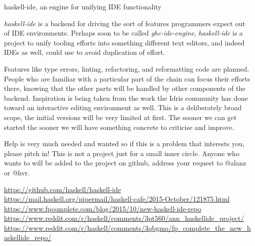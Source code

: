 \documentclass[DIV16,twocolumn,10pt]{scrreprt}
\begin{document}
\begin{hcarentry}{haskell-ide, an engine for unifying IDE functionality}

\makeheader

\textit{haskell-ide} is a backend for driving the sort of features programmers expect out of IDE environments. Perhaps soon to be called \textit{ghc-ide-engine}, \textit{haskell-ide} is a project to unify tooling efforts into something different text editors, and indeed IDEs as well, could use to avoid duplication of effort.

Features like type errors, linting, refactoring, and reformatting code are planned. People who are familiar with a particular part of the chain can focus their efforts there, knowing that the other parts will be handled by other components of the backend. Inspiration is being taken from the work the Idris community has done toward an interactive editing environment as well. This is a deliberately broad scope, the initial versions will be very limited at first. The sooner we can get started the sooner we will have something concrete to criticise and improve.

Help is very much needed and wanted so if this is a problem that interests you, please pitch in! This is not a project just for a small inner circle. Anyone who wants to will be added to the project on github, address your request to @alanz or @hvr.

\FurtherReading
  \url{https://github.com/haskell/haskell-ide} \\
  \url{https://mail.haskell.org/pipermail/haskell-cafe/2015-October/121875.html} \\
  \url{https://www.fpcomplete.com/blog/2015/10/new-haskell-ide-repo} \\
  \url{https://www.reddit.com/r/haskell/comments/3pt560/ann_haskellide_project/} \\
  \url{https://www.reddit.com/r/haskell/comments/3qbgmo/fp_complete_the_new_haskellide_repo/}

\end{hcarentry}
\end{document}
